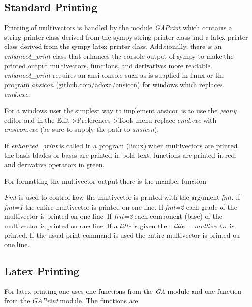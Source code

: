 \documentclass[letterpaper,10pt,english]{sphinxmanual}
\begin{document}
\subsection{Standard Printing}
\label{GA:standard-printing}
Printing of multivectors is handled by the module \emph{GAPrint} which contains
a string printer class derived from the sympy string printer class and a latex
printer class derived from the sympy latex printer class.  Additionally, there
is an \emph{enhanced\_print} class that enhances the console output of sympy to make
the printed output multivectors, functions, and derivatives more readable.
\emph{enhanced\_print} requires an ansi console such as is supplied in linux or the
program \emph{ansicon} (github.com/adoxa/ansicon) for windows which replaces \emph{cmd.exe}.

For a windows user the simplest way to implement ansicon is to use the \emph{geany}
editor and in the Edit-\textgreater{}Preferences-\textgreater{}Tools menu replace \emph{cmd.exe} with
\emph{ansicon.exe} (be sure to supply the path to \emph{ansicon}).

If \emph{enhanced\_print} is called in a program (linux) when multivectors are printed
the basis blades or bases are printed in bold text, functions are printed in red,
and derivative operators in green.

For formatting the multivector output there is the member function

\begin{fulllineitems}
\label{GA:Fmt}
\end{fulllineitems}


\emph{Fmt} is used to control how the multivector is printed with the argument
\emph{fmt}.  If \emph{fmt=1} the entire multivector is printed on one line.  If
\emph{fmt=2} each grade of the multivector is printed on one line.  If \emph{fmt=3}
each component (base) of the multivector is printed on one line.  If a
\emph{title} is given then \emph{title = multivector} is printed.  If the usual print
command is used the entire multivector is printed on one line.


\subsection{Latex Printing}
\label{GA:latex-printing}
For latex printing one uses one functions from the \emph{GA} module and one
function from the \emph{GAPrint} module.  The
functions are
\end{document}
